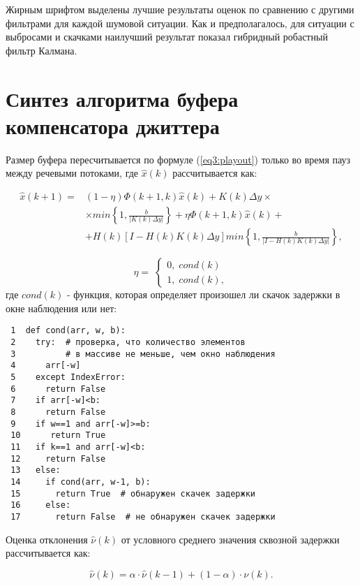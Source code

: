 Жирным шрифтом выделены лучшие результаты оценок по сравнению с другими фильтрами для каждой шумовой ситуации. Как и предполагалось, для ситуации с выбросами и скачками наилучший результат показал гибридный робастный фильтр Калмана.
\clearpage

\section{Синтез алгоритма буфера компенсатора джиттера} \label{sect3_5}

Размер буфера пересчитывается по формуле (\ref{eq3:playout}) только во время пауз между речевыми потоками, где $\hat{x}(k)$ рассчитывается как:

\begin{equation}\label{eq3:syntes1}
\begin{split}
\hat{x}(k+1)=&(1-\eta) \Phi(k+1,k)\hat{x}(k)+K(k)\Delta y\times \\
&\times min\left\{1,\frac{b}{|K(k)\Delta y|}\right\}+\eta \Phi(k+1,k)\hat{x}(k)+\\
&+H(k)[I-H(k)K(k)\Delta y] min\left\{1,\frac{b}{|I-H(k)K(k)\Delta y|}\right\},
\end{split}
\end{equation}

\begin{equation}\label{eq3:syntes2}
\eta= \;
\begin{cases}
0, \; cond(k) \\    
1, \; cond(k),    
\end{cases}
\end{equation}
\noindent где $cond(k)$ - функция, которая определяет произошел ли скачок задержки в окне наблюдения или нет:
\begin{verbatim}
 1  def cond(arr, w, b):  
 2    try:  # проверка, что количество элементов 
 3          # в массиве не меньше, чем окно наблюдения
 4      arr[-w] 
 5    except IndexError:
 6      return False
 7    if arr[-w]<b:
 8      return False
 9    if w==1 and arr[-w]>=b:
 10      return True
 11   if k==1 and arr[-w]<b:
 12     return False
 13   else:
 14     if cond(arr, w-1, b):
 15       return True  # обнаружен скачек задержки
 16     else:
 17       return False  # не обнаружен скачек задержки
\end{verbatim}

Оценка отклонения $\hat{\nu}(k)$ от условного среднего значения сквозной задержки рассчитывается как:

\begin{equation}\label{eq3:syntes4}
\hat{\nu}(k)=\alpha\cdot\hat{\nu}(k-1)+(1-\alpha)\cdot \nu(k).
\end{equation}

